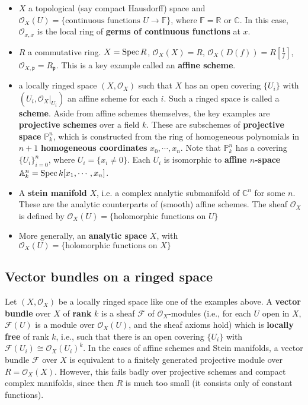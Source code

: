 \documentclass[main]{subfiles}
\begin{document}
\begin{example}
\begin{itemize}
\item $X$ a topological (say compact Hausdorff) space and $\mathcal O_X(U)=\{\text{continuous functions }U\to\mathbb F\}$, where $\mathbb F=\mathbb R$ or $\mathbb C$. In this case, $\mathcal O_{x,x}$ is the local ring of \textbf{germs of continuous functions} at $x$.
\item $R$ a commutative ring. $X=\operatorname{Spec} R$, $\mathcal O_X(X)=R$, $\mathcal O_X(D(f))=R[\frac{1}{f}]$, $\mathcal O_{X,\mathfrak p}=R_{\mathfrak p}$. This is a key example called an \textbf{affine scheme}.
\item a locally ringed space $(X,\mathcal O_X)$ such that $X$ has an open covering $\{U_i\}$ with $(U_i,\mathcal O_X|_{U_i})$ an affine scheme for each $i$. Such a ringed space is called a \textbf{scheme}. Aside from affine schemes themselves, the key examples are \textbf{projective schemes} over a field $k$. These are subschemes of \textbf{projective space} $\mathbb P^n_k$, which is constructed from the ring of homogeneous polynomials in $n+1$ \textbf{homogeneous coordinates} $x_0,\cdots,x_n$. Note that $\mathbb P_k^n$ has a covering $\{U_i\}_{i=0}^n$, where $U_i=\{x_i\neq 0\}$. Each $U_i$ is isomorphic to \textbf{affine $n$-space} $\mathbb A^n_k=\operatorname{Spec} k[x_1,\cdots,x_n]$.
\item A \textbf{stein manifold} $X$, i.e. a complex analytic submanifold of $\mathbb C^n$ for some $n$. These are the analytic counterparts of (smooth) affine schemes. The sheaf $\mathcal O_X$ is defined by $\mathcal O_X(U)=\{\text{holomorphic functions on }U\}$
\item More generally, an \textbf{analytic space} $X$, with $\mathcal O_X(U)=\{\text{holomorphic functions on }X\}$
\end{itemize}
\end{example}

\subsection{Vector bundles on a ringed space}

Let $(X,\mathcal O_X)$ be a locally ringed space like one of the examples above. A \textbf{vector bundle} over $X$ of \textbf{rank} $k$ is a sheaf $\mathcal F$ of $\mathcal O_X$-modules (i.e., for each $U$ open in $X$, $\mathcal F(U)$ is a module over $\mathcal O_X(U)$, and the sheaf axioms hold) which is \textbf{locally free} of rank $k$, i.e., such that there is an open covering $\{U_i\}$ with $\mathcal F(U_i)\cong\mathcal O_X(U_i)^k$. In the cases of affine schemes and Stein manifolds, a vector bundle $\mathcal F$ over $X$ is equivalent to a finitely generated projective module over $R=\mathcal O_X(X)$. However, this fails badly over projective schemes and compact complex manifolds, since then $R$ is much too small (it consists only of constant functions).
\end{document}
